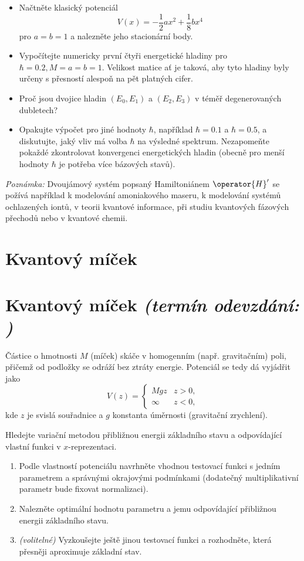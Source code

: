 \documentclass[a4paper,11pt,twoside]{book}
\def\np{\newpage}
\newcommand{\exercise}[2][]{\ifthenelse{\isempty{#1}}
	{\np\section{#2}}
	{\np\section[#2]{{#2} \small{\it{(termín odevzdání: {#1})}}}}
}
\begin{document}
\begin{enumerate}
        \begin{itemize}
        \item 
            Načtněte klasický potenciál
            \begin{equation*}
                V(x)=-\frac{1}{2}ax^{2}+\frac{1}{8}bx^{4}
            \end{equation*}
            pro $a=b=1$ a nalezněte jeho stacionární body.
        \item 
            Vypočítejte numericky první čtyři energetické hladiny pro $\hbar=0.2,M=a=b=1$.
            Velikost matice ať je taková, aby tyto hladiny byly určeny s přesností alespoň na pět platných cifer.
        \item 
            Proč jsou dvojice hladin $(E_{0}, E_{1})$ a $(E_{2}, E_{3})$ v téměř degenerovaných dubletech?        
        \item 
            Opakujte výpočet pro jiné hodnoty $\hbar$, například $\hbar=0.1$ a $\hbar=0.5$, a diskutujte, jaký vliv má volba $\hbar$ na výsledné spektrum.
            Nezapomeňte pokaždé zkontrolovat konvergenci energetických hladin (obecně pro menší hodnoty $\hbar$ je potřeba více bázových stavů).
        \end{itemize}		
        
        \emph{Poznámka:} Dvoujámový systém popsaný Hamiltoniánem $\operator{H}'$ se požívá například k modelování amoniakového maseru, k modelování systémů ochlazených iontů, v teorii kvantové informace, při studiu kvantových fázových přechodů nebo v kvantové chemii.
            
    \end{enumerate}

\exercise{Kvantový míček}
    Částice o hmotnosti $M$ (míček) skáče v homogenním (např. gravitačním) poli, přičemž od podložky se odráží bez ztráty energie.
    Potenciál se tedy dá vyjádřit jako
    \begin{equation*}
        V(z)=
        \begin{cases}
        Mgz & z > 0, \\
        \infty & z < 0,
        \end{cases}
    \end{equation*}
    kde $z$ je svislá souřadnice a $g$ konstanta úměrnosti (gravitační zrychlení).

    Hledejte variační metodou přibližnou energii základního stavu a odpovídající vlastní funkci v $x$-reprezentaci.
    \begin{enumerate}
        \item 
            Podle vlastností potenciálu navrhněte vhodnou testovací funkci s jedním parametrem a správnými okrajovými podmínkami (dodatečný multiplikativní parametr bude fixovat normalizaci).

        \item 
            Nalezněte optimální hodnotu parametru a jemu odpovídající přibližnou energii základního stavu.

        \item 
            \emph{(volitelné)} Vyzkoušejte ještě jinou testovací funkci a rozhodněte, která přesněji aproximuje základní stav.
    \end{enumerate}	
\end{document}
